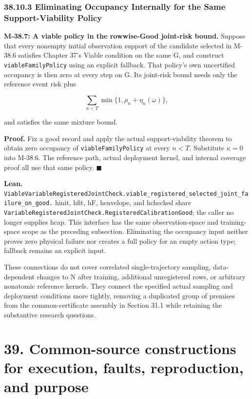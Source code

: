 \documentclass[
  english,
  11pt,
  oneside]{book}
\newcounter{none} %
\begin{document}
\subsection{38.10.3 Eliminating Occupancy Internally for the Same Support-Viability Policy}\label{eliminating-occupancy-internally-for-the-same-support-viability-policy}

\hypertarget{m-38-7}{}\label{m-38-7}

\textbf{M-38.7: A viable policy in the rowwise-Good joint-risk bound.} Suppose that every nonempty initial observation support of the candidate selected in M-38.6 satisfies Chapter 37's Viable condition on the same G, and construct \nolinkurl{viableFamilyPolicy} using an explicit fallback. That policy's own uncertified occupancy is then zero at every step on G. Its joint-risk bound needs only the reference event risk plus

\[\sum_{n<T}\min\{1,\rho_n+\eta_n(\omega)\},\]

and satisfies the same mixture bound.

\textbf{Proof.} Fix a good record and apply the actual support-viability theorem to obtain zero occupancy of \nolinkurl{viableFamilyPolicy} at every \(n<T\). Substitute \(\kappa=0\) into M-38.6. The reference path, actual deployment kernel, and internal coverage proof all use that same policy. \(\blacksquare\)

\textbf{Lean.} \nolinkurl{ViableVariableRegisteredJointCheck.viable_registered_selected_joint_failure_on_good.} hinit, hfit, hF, henvelope, and hchecked share \nolinkurl{VariableRegisteredJointCheck.RegisteredCalibrationGood}; the caller no longer supplies hcap. This interface has the same observation-space and training-space scope as the preceding subsection. Eliminating the occupancy input neither proves zero physical failure nor creates a full policy for an empty action type; fallback remains an explicit input.

These connections do not cover correlated single-trajectory sampling, data-dependent changes to N after training, additional unregistered rows, or arbitrary nonatomic reference kernels. They connect the specified actual sampling and deployment conditions more tightly, removing a duplicated group of premises from the common-certificate assembly in Section 31.1 while retaining the substantive research questions.

\chapter{39. Common-source constructions for execution, faults, reproduction, and purpose}\label{ch-39}
\end{document}
